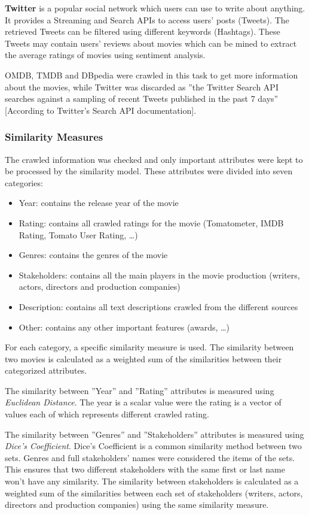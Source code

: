 \documentclass{sigish}
\begin{document}
\textbf{Twitter} is a popular social network which users can use to write about anything. It provides a Streaming and Search APIs to access users' posts (Tweets). The retrieved Tweets can be filtered using different keywords (Hashtags). These Tweets may contain users' reviews about movies which can be mined to extract the average ratings of movies using sentiment analysis.

OMDB, TMDB and DBpedia were crawled in this task to get more information about the movies, while Twitter was discarded as ''the Twitter Search API searches against a sampling of recent Tweets published in the past 7 days'' [According to Twitter's Search API documentation].

\subsubsection*{Similarity Measures}

The crawled information was checked and only important attributes were kept to be processed by the similarity model. These attributes were divided into seven categories:
\begin{itemize}
\item Year: contains the release year of the movie
\item Rating: contains all crawled ratings for the movie (Tomatometer, IMDB Rating, Tomato User Rating, …)
\item Genres: contains the genres of the movie
\item Stakeholders: contains all the main players in the movie production (writers, actors, directors and production companies)
\item Description: contains all text descriptions crawled from the different sources
\item Other: contains any other important features (awards, …)
\end{itemize}
For each category, a specific similarity measure is used. The similarity between two movies is calculated as a weighted sum of the similarities between their categorized attributes.

The similarity between ''Year'' and ''Rating'' attributes is measured using \textit{Euclidean Distance}. The year is a scalar value were the rating is a vector of values each of which represents different crawled rating.

The similarity between ''Genres'' and ''Stakeholders'' attributes is measured using \textit{Dice's Coefficient}. Dice's Coefficient is a common similarity method between two sets. Genres and full stakeholders' names were considered the items of the sets. This ensures that two different stakeholders with the same first or last name won't have any similarity. The similarity between stakeholders is calculated as a weighted sum of the similarities between each set of stakeholders (writers, actors, directors and production companies) using the same similarity measure.
\end{document}
